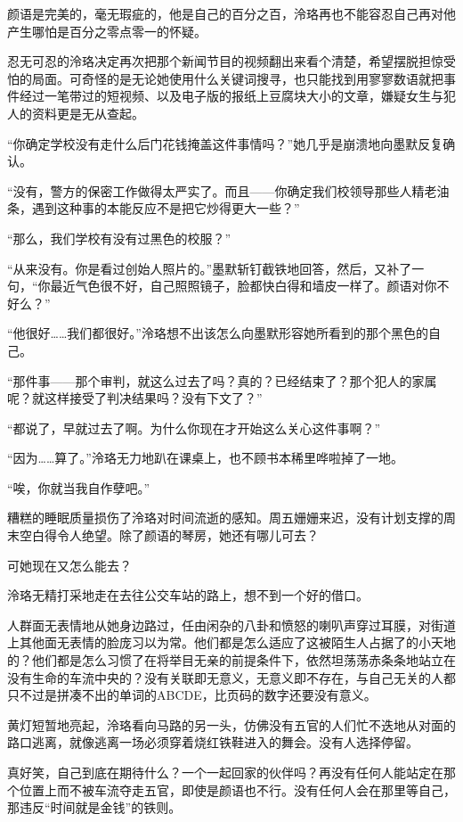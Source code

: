 \documentclass[UTF8, scheme = chinese, openany]{ctexbook}
\begin{document}
颜语是完美的，毫无瑕疵的，他是自己的百分之百，泠珞再也不能容忍自己再对他产生哪怕是百分之零点零一的怀疑。

忍无可忍的泠珞决定再次把那个新闻节目的视频翻出来看个清楚，希望摆脱担惊受怕的局面。可奇怪的是无论她使用什么关键词搜寻，也只能找到用寥寥数语就把事件经过一笔带过的短视频、以及电子版的报纸上豆腐块大小的文章，嫌疑女生与犯人的资料更是无从查起。

“你确定学校没有走什么后门花钱掩盖这件事情吗？”她几乎是崩溃地向墨默反复确认。

“没有，警方的保密工作做得太严实了。而且——你确定我们校领导那些人精老油条，遇到这种事的本能反应不是把它炒得更大一些？”

“那么，我们学校有没有过黑色的校服？”

“从来没有。你是看过创始人照片的。”墨默斩钉截铁地回答，然后，又补了一句，“你最近气色很不好，自己照照镜子，脸都快白得和墙皮一样了。颜语对你不好么？”

“他很好……我们都很好。”泠珞想不出该怎么向墨默形容她所看到的那个黑色的自己。

“那件事——那个审判，就这么过去了吗？真的？已经结束了？那个犯人的家属呢？就这样接受了判决结果吗？没有下文了？”

“都说了，早就过去了啊。为什么你现在才开始这么关心这件事啊？”

“因为……算了。”泠珞无力地趴在课桌上，也不顾书本稀里哗啦掉了一地。

“唉，你就当我自作孽吧。”

糟糕的睡眠质量损伤了泠珞对时间流逝的感知。周五姗姗来迟，没有计划支撑的周末空白得令人绝望。除了颜语的琴房，她还有哪儿可去？

可她现在又怎么能去？

泠珞无精打采地走在去往公交车站的路上，想不到一个好的借口。

人群面无表情地从她身边路过，任由闲杂的八卦和愤怒的喇叭声穿过耳膜，对街道上其他面无表情的脸庞习以为常。他们都是怎么适应了这被陌生人占据了的小天地的？他们都是怎么习惯了在将举目无亲的前提条件下，依然坦荡荡赤条条地站立在没有生命的车流中央的？没有关联即无意义，无意义即不存在，与自己无关的人都只不过是拼凑不出的单词的ABCDE，比页码的数字还要没有意义。

黄灯短暂地亮起，泠珞看向马路的另一头，仿佛没有五官的人们忙不迭地从对面的路口逃离，就像逃离一场必须穿着烧红铁鞋进入的舞会。没有人选择停留。

真好笑，自己到底在期待什么？一个一起回家的伙伴吗？再没有任何人能站定在那个位置上而不被车流夺走五官，即使是颜语也不行。没有任何人会在那里等自己，那违反“时间就是金钱”的铁则。
\end{document}
